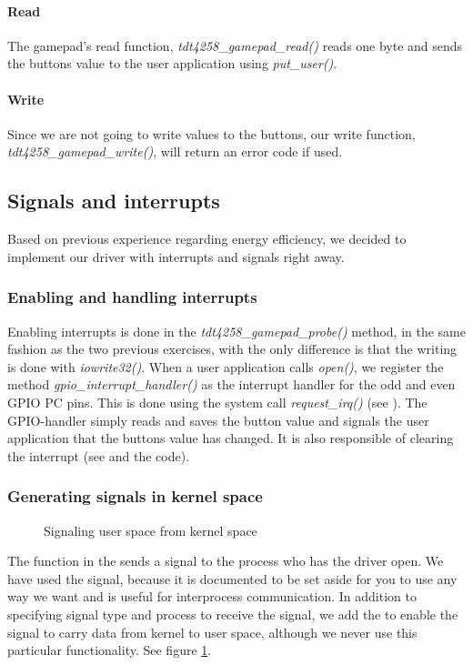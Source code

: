 \paragraph{Read} The gamepad's read function, \emph{tdt4258\_gamepad\_read()} reads one byte and sends the buttons value to the user application using \emph{put\_user()}. 

\paragraph{Write} Since we are not going to write values to the buttons, our write function, \emph{tdt4258\_gamepad\_write()}, will return an error code if used.

\subsection{Signals and interrupts}
\label{subsection:signals-and-interrupts}
Based on previous experience regarding energy efficiency, we decided to implement our driver with interrupts and signals right away.
\subsubsection{Enabling and handling interrupts}

Enabling interrupts is done in the \emph{tdt4258\_gamepad\_probe()} method, in the same fashion as the two previous exercises, with the only difference is that the writing is done with \emph{iowrite32()}. When a user application calls \emph{open()}, we register the method \emph{gpio\_interrupt\_handler()} as the interrupt handler for the odd and even GPIO PC pins. This is done using the system call \emph{request\_irq()} (see \cite{interrupt_handler}). The GPIO-handler simply reads and saves the button value and signals the user application that the buttons value has changed. It is also responsible of clearing the interrupt (see \cite[section 3]{compendium} and the code).   

\subsubsection{Generating signals in kernel space}
\begin{figure}[h]
	\centering
	
	\caption{Signaling user space from kernel space}
	\label{fig:signal-user-application}
\end{figure}
The  function in the  sends a signal to the process who has the driver open. We have used the  signal, because it is documented to be set aside for you to use any way we want and is useful for interprocess communication. In addition to specifying signal type and process to receive the signal, we add the  to enable the signal to carry data from kernel to user space, although we never use this particular functionality. See figure \ref{fig:signal-user-application}.

